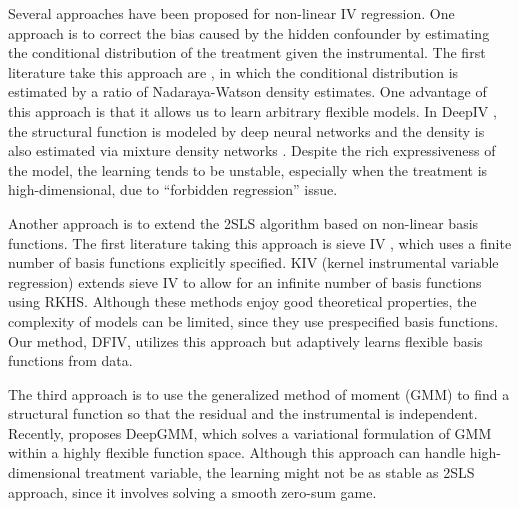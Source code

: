Several approaches have been proposed for non-linear IV regression. One approach is 
to correct the bias caused by the hidden confounder by estimating the conditional distribution of the treatment given the instrumental. The first literature take this approach are \citet{Carrasco2007, Darolles2011}, in which the conditional distribution is estimated by a ratio of Nadaraya-Watson density estimates. One advantage of this approach is that it allows us to learn arbitrary flexible models. In DeepIV \citep{Hartford2017}, the structural function is modeled by deep neural networks and the density is also estimated via mixture density networks \citep{Bishop2006}. Despite the rich expressiveness of the model, the learning tends to be unstable, especially when the treatment is high-dimensional, due to ``forbidden regression'' issue.

Another approach is to extend the 2SLS algorithm based on non-linear basis functions. The first literature taking this approach is sieve IV \citep{Newey2003, Chen2018}, which uses a finite number of basis functions explicitly specified. KIV (kernel instrumental variable regression) \citep{Singh2019} extends sieve IV to allow for an infinite number of basis functions using RKHS. Although these methods enjoy good theoretical properties, the complexity of models can be limited, since they use prespecified basis functions. Our method, DFIV, utilizes this approach but adaptively learns flexible basis functions from data. 

The third approach is to use the generalized method of moment (GMM) \citep{Hansen1982} to find a structural function so that the residual and the instrumental is independent. Recently, \citet{Bennett2019} proposes DeepGMM, which solves a variational formulation of GMM within a highly flexible function space. Although this approach can handle high-dimensional treatment variable, the learning might not be as stable as 2SLS approach, since it involves solving a smooth zero-sum game.

